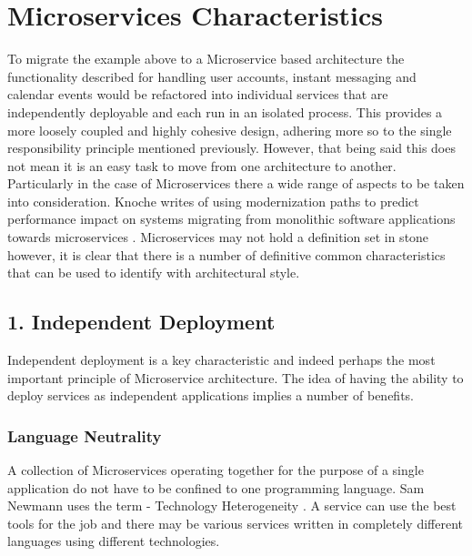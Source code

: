 \documentclass[journal]{IEEEtran}
\begin{document}
\section{Microservices Characteristics}

To migrate the example above to a Microservice based architecture the functionality described for handling user accounts, instant messaging and calendar events would be refactored into individual services that are independently deployable and each run in an isolated process. This provides a more loosely coupled and highly cohesive design, adhering more so to the single responsibility principle mentioned previously. However, that being said this does not mean it is an easy task to move from one architecture to another. Particularly in the case of Microservices there a wide range of aspects to be taken into consideration. Knoche writes of using modernization paths to predict performance impact on systems migrating from monolithic software applications towards microservices \cite{Knoche:2016:SRP:2851553.2892039}.
Microservices may not hold a definition set in stone however, it is clear that there is a number of definitive common characteristics that can be used to identify with architectural style.

\subsection*{ 1. Independent Deployment }
Independent deployment is a key characteristic and indeed perhaps the most important principle of Microservice architecture. The idea of having the ability to deploy services as independent applications implies a number of benefits.

\subsubsection*{Language Neutrality}
A collection of Microservices operating together for the purpose of a single application do not have to be confined to one programming language. Sam Newmann uses the term - Technology Heterogeneity \cite{BuildingMicroServices}. A service can use the best tools for the job and there may be various services written in completely different languages using different technologies.
\end{document}
